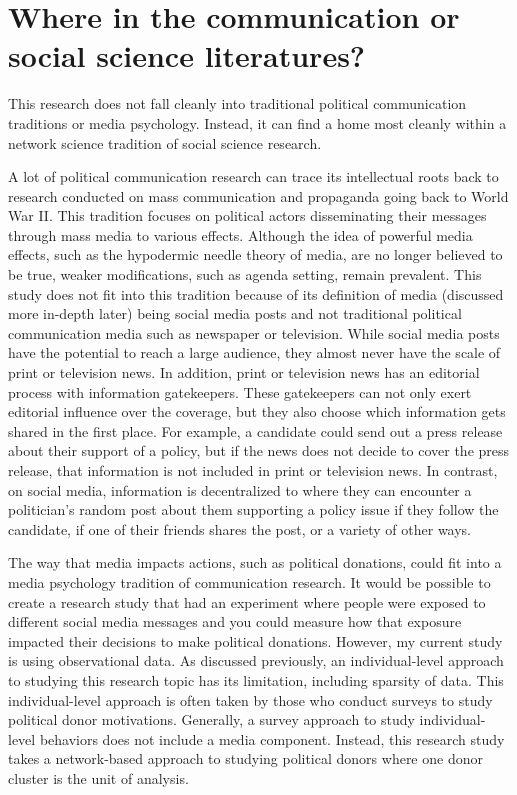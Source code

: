 \documentclass[12pt,]{article}
\begin{document}
\hypertarget{where-in-the-communication-or-social-science-literatures}{%
\section{Where in the communication or social science
literatures?}\label{where-in-the-communication-or-social-science-literatures}}

This research does not fall cleanly into traditional political
communication traditions or media psychology. Instead, it can find a
home most cleanly within a network science tradition of social science
research.

A lot of political communication research can trace its intellectual
roots back to research conducted on mass communication and propaganda
going back to World War II. This tradition focuses on political actors
disseminating their messages through mass media to various effects.
Although the idea of powerful media effects, such as the hypodermic
needle theory of media, are no longer believed to be true, weaker
modifications, such as agenda setting, remain prevalent. This study does
not fit into this tradition because of its definition of media
(discussed more in-depth later) being social media posts and not
traditional political communication media such as newspaper or
television. While social media posts have the potential to reach a large
audience, they almost never have the scale of print or television news.
In addition, print or television news has an editorial process with
information gatekeepers. These gatekeepers can not only exert editorial
influence over the coverage, but they also choose which information gets
shared in the first place. For example, a candidate could send out a
press release about their support of a policy, but if the news does not
decide to cover the press release, that information is not included in
print or television news. In contrast, on social media, information is
decentralized to where they can encounter a politician's random post
about them supporting a policy issue if they follow the candidate, if
one of their friends shares the post, or a variety of other ways.

The way that media impacts actions, such as political donations, could
fit into a media psychology tradition of communication research. It
would be possible to create a research study that had an experiment
where people were exposed to different social media messages and you
could measure how that exposure impacted their decisions to make
political donations. However, my current study is using observational
data. As discussed previously, an individual-level approach to studying
this research topic has its limitation, including sparsity of data. This
individual-level approach is often taken by those who conduct surveys to
study political donor motivations. Generally, a survey approach to study
individual-level behaviors does not include a media component. Instead,
this research study takes a network-based approach to studying political
donors where one donor cluster is the unit of analysis.
\end{document}
